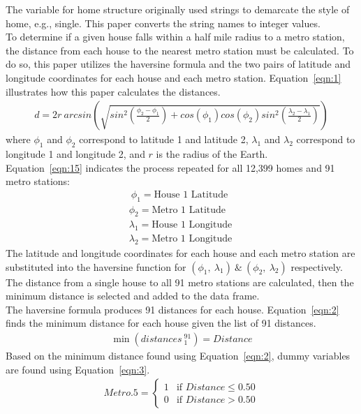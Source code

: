 \documentclass[12pt]{report}
\newcommand\tab[1][.60cm]{\hspace*{#1}}
\begin{document}
\tab The variable for home structure originally used strings to demarcate the style of home, e.g., single. This paper converts the string names to integer values.\\
\tab To determine if a given house falls within a half mile radius to a metro station, the distance from each house to the nearest metro station must be calculated. To do so, this paper utilizes the haversine formula and the two pairs of latitude and longitude coordinates for each house and each metro station. Equation~\ref{eqn:1} illustrates how this paper calculates the distances.
\begin{gather}
\ d=2r\ arcsin \left(\sqrt{sin^{2} \left( \frac{\phi_{2}-\phi_{1}} {2} \right) +cos(\phi_1)cos(\phi_2)sin^2 \left( \frac{\lambda_{2}-\lambda_{1}} {2} \right) } \right) \
\label{eqn:1}
\end{gather}
where $\phi_1$ and $\phi_2$ correspond to latitude 1 and latitude 2, $\lambda_1$ and $\lambda_2$ correspond to longitude 1 and longitude 2, and $r$ is the radius of the Earth.\\
\tab Equation~\ref{eqn:15} indicates the process repeated for all 12,399 homes and 91 metro stations:
\begin{gather}
\ \phi_1 = \text{House\ 1\ Latitude} \nonumber\\
\phi_2 = \text{Metro\ 1\ Latitude} \nonumber\\
\lambda_1 = \text{House\ 1\ Longitude} \nonumber\\
\lambda_2 = \text{Metro\ 1\ Longitude}\ 
\label{eqn:15}
\end{gather}
\tab The latitude and longitude coordinates for each house and each metro station are substituted into the haversine function for $(\phi_1,\ \lambda_1) \ \& \ (\phi_2,\ \lambda_2)$ respectively. The distance from a single house to all 91 metro stations are
calculated, then the minimum distance is selected and added to the data frame. \\
\tab The haversine formula produces 91 distances for each house. Equation~\ref{eqn:2} finds the minimum distance for each house given the list of 91 distances.
\begin{gather}
\ \min{(distances\ _{1}^{91})} = Distance \ 
\label{eqn:2}
\end{gather}
\clearpage
Based on the minimum distance found using Equation~\ref{eqn:2}, dummy variables are found using Equation~\ref{eqn:3}.
\begin{gather}
\ 
Metro.5=
\begin{cases}
1 & \text{if } Distance \leq 0.50\\
0 & \text{if } Distance > 0.50
\end{cases}
\ 
\label{eqn:3}
\end{gather}
\end{document}
